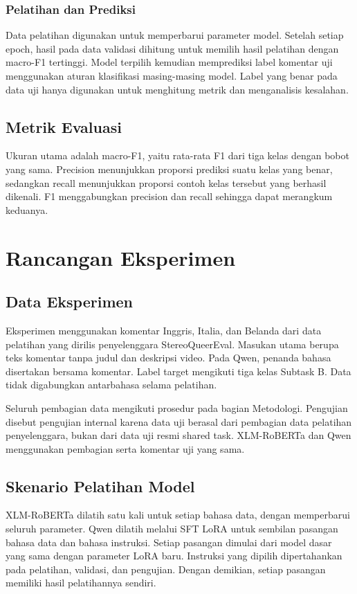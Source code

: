 \documentclass[11pt]{article}
\begin{document}
\subsubsection{Pelatihan dan Prediksi}
Data pelatihan digunakan untuk memperbarui parameter model. Setelah setiap epoch, hasil pada data validasi dihitung untuk memilih hasil pelatihan dengan macro-F1 tertinggi. Model terpilih kemudian memprediksi label komentar uji menggunakan aturan klasifikasi masing-masing model. Label yang benar pada data uji hanya digunakan untuk menghitung metrik dan menganalisis kesalahan.

\subsection{Metrik Evaluasi}
Ukuran utama adalah macro-F1, yaitu rata-rata F1 dari tiga kelas dengan bobot yang sama. Precision menunjukkan proporsi prediksi suatu kelas yang benar, sedangkan recall menunjukkan proporsi contoh kelas tersebut yang berhasil dikenali. F1 menggabungkan precision dan recall sehingga dapat merangkum keduanya.

\section{Rancangan Eksperimen}
\subsection{Data Eksperimen}
Eksperimen menggunakan komentar Inggris, Italia, dan Belanda dari data pelatihan yang dirilis penyelenggara StereoQueerEval. Masukan utama berupa teks komentar tanpa judul dan deskripsi video. Pada Qwen, penanda bahasa disertakan bersama komentar. Label target mengikuti tiga kelas Subtask B. Data tidak digabungkan antarbahasa selama pelatihan.

Seluruh pembagian data mengikuti prosedur pada bagian Metodologi. Pengujian disebut pengujian internal karena data uji berasal dari pembagian data pelatihan penyelenggara, bukan dari data uji resmi shared task. XLM-RoBERTa dan Qwen menggunakan pembagian serta komentar uji yang sama.

\subsection{Skenario Pelatihan Model}
XLM-RoBERTa dilatih satu kali untuk setiap bahasa data, dengan memperbarui seluruh parameter. Qwen dilatih melalui SFT LoRA untuk sembilan pasangan bahasa data dan bahasa instruksi. Setiap pasangan dimulai dari model dasar yang sama dengan parameter LoRA baru. Instruksi yang dipilih dipertahankan pada pelatihan, validasi, dan pengujian. Dengan demikian, setiap pasangan memiliki hasil pelatihannya sendiri.
\end{document}
